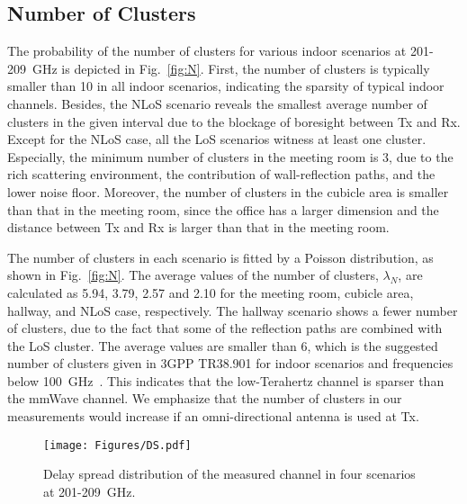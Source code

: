 \documentclass[journal,12pt,draftclsnofoot,onecolumn]{IEEEtran}
\begin{document}
\subsection{Number of Clusters}
The probability of the number of clusters for various indoor scenarios at 201-209~GHz is depicted in Fig.~\ref{fig:N}. 
First, the number of clusters is typically smaller than 10 in all indoor scenarios, indicating the sparsity of typical indoor channels.
Besides, the NLoS scenario reveals the smallest average number of clusters in the given interval due to the blockage of boresight between Tx and Rx. Except for the NLoS case, all the LoS scenarios witness at least one cluster. Especially, the minimum number of clusters in the meeting room is 3, due to the rich scattering environment, the contribution of wall-reflection paths, and the lower noise floor.
Moreover, the number of clusters in the cubicle area is smaller than that in the meeting room, since the office has a larger dimension and the distance between Tx and Rx is larger than that in the meeting room.
\par The number of clusters in each scenario is fitted by a Poisson distribution, as shown in Fig.~\ref{fig:N}. The average values of the number of clusters, $\lambda_N$, are calculated as 5.94, 3.79, 2.57 and 2.10 for the meeting room, cubicle area, hallway, and NLoS case, respectively. The hallway scenario shows a fewer number of clusters, due to the fact that some of the reflection paths are combined with the LoS cluster. The average values are smaller than 6, which is the suggested number of clusters given in 3GPP TR38.901 for indoor scenarios and frequencies below 100~GHz~\cite{3gpp.38.901}. This indicates that the low-Terahertz channel is sparser than the mmWave channel. We emphasize that the number of clusters in our measurements would increase if an omni-directional antenna is used at Tx.

\begin{figure}
\centering
\texttt{[image: Figures/DS.pdf]}
\caption{Delay spread distribution of the measured channel in four scenarios at 201-209~GHz.}
\label{fig:ds_201-209}
\end{figure}
\end{document}
